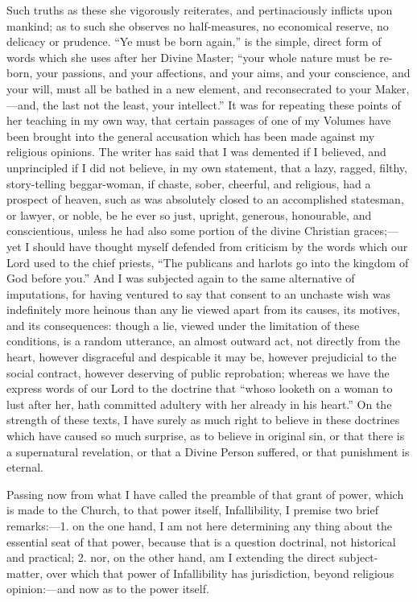 Such truths as these she vigorously reiterates, and pertinaciously
inflicts upon mankind; as to such she observes no half-measures, no
economical reserve, no delicacy or prudence. ``Ye must be born
again,'' is the simple, direct form of words which she uses after
her Divine Master; ``your whole nature must be re-born, your
passions, and your affections, and your aims, and your conscience, and
your will, must all be bathed in a new element, and reconsecrated to
your Maker,—and, the last not the least, your intellect.''
It was for repeating these points of her teaching in my own way, that
certain passages of one of my Volumes have been brought into the general
accusation which has been made against my religious opinions. The writer
has said that I was demented if I believed, and unprincipled if I did
not believe, in my own statement, that a lazy, ragged, filthy,
story-telling beggar-woman, if chaste, sober, cheerful, and religious,
had a prospect of heaven, such as was absolutely closed to an
accomplished statesman, or lawyer, or noble, be he ever so just,
upright, generous, honourable, and conscientious, unless he had also
some portion of the divine Christian graces;—yet I
should have thought myself defended from criticism by the words
which our Lord used to the chief priests, ``The publicans and
harlots go into the kingdom of God before you.'' And I was subjected
again to the same alternative of imputations, for having ventured to say
that consent to an unchaste wish was indefinitely more heinous than any
lie viewed apart from its causes, its motives, and its consequences:
though a lie, viewed under the limitation of these conditions, is a
random utterance, an almost outward act, not directly from the heart,
however disgraceful and despicable it may be, however
prejudicial to the social contract, however deserving of public
reprobation; whereas we have the express words of our Lord to the
doctrine that ``whoso looketh on a woman to lust after her, hath
committed adultery with her already in his heart.'' On the strength
of these texts, I have surely as much right to believe in these
doctrines which have caused so much surprise, as to believe in original sin, or that there is a supernatural
revelation, or that a Divine Person suffered, or that punishment is
eternal.

Passing now from what I have called the preamble of that grant of
power, which is made to the Church, to that power
itself, Infallibility, I premise two brief remarks:—1.
on the one hand, I am not here determining any thing about the essential
seat of that power, because that is a question doctrinal, not historical
and practical; 2. nor, on the other hand, am I extending the
direct subject-matter, over which that power of Infallibility
has jurisdiction, beyond religious opinion:—and now as to the power
itself.

